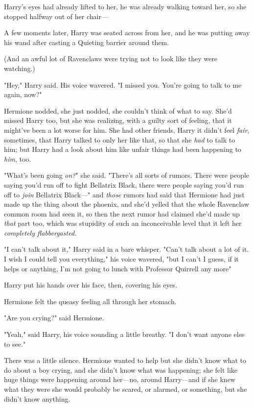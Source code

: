 Harry's eyes had already lifted to her, he was already walking toward her, so
she stopped halfway out of her chair---

A few moments later, Harry was seated across from her, and he was putting away
his wand after casting a Quieting barrier around them.

(And an awful lot of Ravenclaws were trying not to look like they were
watching.)

"Hey," Harry said. His voice wavered. "I missed you. You're{\el} going to
talk to me again, now?"

Hermione nodded, she just nodded, she couldn't think of what to say. She'd
missed Harry too, but she was realizing, with a guilty sort of feeling, that it
might've been a lot worse for him. She had other friends, Harry{\el} it
didn't feel \emph{fair}, sometimes, that Harry talked to only her like that, so
that she \emph{had} to talk to him; but Harry had a look about him like unfair
things had been happening to \emph{him}, too.

"What's been going \emph{on?}" she said. "There's all sorts of rumors. There
were people saying you'd run off to fight Bellatrix Black, there were people
saying you'd run off to \emph{join} Bellatrix Black---" and \emph{those} rumors
had said that Hermione had just made up the thing about the phoenix, and she'd
yelled that the whole Ravenclaw common room had seen it, so then the next rumor
had claimed she'd made up \emph{that} part too, which was stupidity of such an
inconceivable level that it left her \emph{completely flabbergasted.}

"I can't talk about it," Harry said in a bare whisper. "Can't talk about a lot
of it. I wish I could tell you everything," his voice wavered, "but I
can't{\el} I guess, if it helps or anything, I'm not going to lunch with
Professor Quirrell any more{\el}"

Harry put his hands over his face, then, covering his eyes.

Hermione felt the queasy feeling all through her stomach.

"Are you crying?" said Hermione.

"Yeah," said Harry, his voice sounding a little breathy. "I don't want anyone
else to see."

There was a little silence. Hermione wanted to help but she didn't know what to
do about a boy crying, and she didn't know what was happening; she felt like
huge things were happening around her---no, around Harry---and if she knew what
they were she would probably be scared, or alarmed, or something, but she
didn't know anything.

